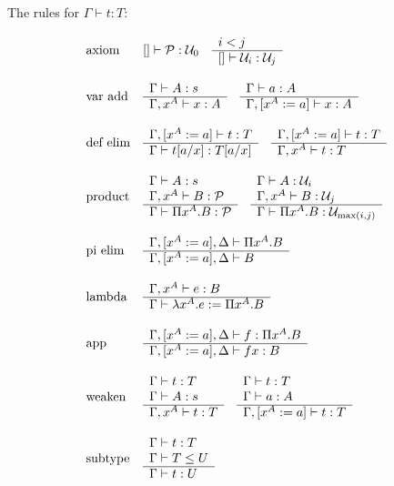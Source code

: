 The rules for $\Gamma \vdash t : T$:

$$
\begin{array}{lllll} 
    \text{axiom} &
    [] \vdash {\cal P}: {\cal U}_0
    \quad
    \begin{array}{l} 
        i < j
     \\ \hline 
        [] \vdash {\cal U}_i : {\cal U}_j
     \end{array}
    \\
    \\
    \text{var add} &
    \begin{array}{l} 
        \Gamma \vdash A: s
     \\ \hline 
        \Gamma, x^A \vdash x: A
     \end{array}
    \quad
    \begin{array}{l} 
        \Gamma \vdash a: A
     \\ \hline 
        \Gamma, [x^A := a] \vdash x: A
     \end{array}
    \\
    \\
    \text{def elim} &
    \begin{array}{l} 
        \Gamma, [x^A:= a] \vdash t : T
     \\ \hline 
        \Gamma \vdash t[a/x] : T[a/x]
     \end{array}
    \quad
    \begin{array}{l} 
        \Gamma, [x^A:= a] \vdash t : T
     \\ \hline 
        \Gamma, x^A \vdash t : T
     \end{array}
    \\
    \\
    \text{product} &
    \begin{array}{l} 
        \Gamma \vdash A: s
        \\
        \Gamma, x^A \vdash B: {\cal P}
     \\ \hline 
        \Gamma \vdash \Pi x^A. B: {\cal P}
     \end{array}
    \quad
    \begin{array}{l} 
        \Gamma \vdash A: {\cal U}_i
        \\
        \Gamma, x^A \vdash B: {\cal U}_j
     \\ \hline 
        \Gamma \vdash \Pi x^A. B: {\cal U}_{\text{max}(i,j)}
     \end{array}
    \\
    \\
    \text{pi elim} &
    \begin{array}{l} 
        \Gamma,[x^A:=a],\Delta \vdash \Pi x^A. B
     \\ \hline 
        \Gamma,[x^A:=a],\Delta \vdash B
     \end{array}
    \\
    \\
    \text{lambda} &
    \begin{array}{l} 
        \Gamma, x^A \vdash e : B
     \\ \hline 
        \Gamma \vdash \lambda x^A. e := \Pi x^A. B
     \end{array}
    \\
    \\
    \text{app} &
    \begin{array}{l} 
        \Gamma, [x^A:=a], \Delta \vdash f : \Pi x^A. B
     \\ \hline 
        \Gamma, [x^A := a], \Delta \vdash f x: B
     \end{array}
    \\
    \\
    \text{weaken} &
    \begin{array}{l} 
        \Gamma \vdash t: T
        \\
        \Gamma \vdash A: s
     \\ \hline 
        \Gamma, x^A \vdash t : T
     \end{array}
    \quad
    \begin{array}{l} 
        \Gamma \vdash t: T
        \\
        \Gamma \vdash a: A
     \\ \hline 
        \Gamma, [x^A:=a] \vdash t : T
     \end{array}
    \\
    \\
    \text{subtype} &
    \begin{array}{l} 
        \Gamma \vdash t : T
        \\
        \Gamma \vdash T \le U
     \\ \hline 
        \Gamma \vdash t: U
     \end{array}
 \end{array}
$$


